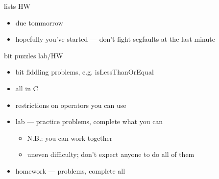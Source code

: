 \begin{frame}{lists HW}
    \begin{itemize}
        \item due tommorrow
        \item hopefully you've started --- don't fight segfaults at the last minute
    \end{itemize}
\end{frame}

\begin{frame}{bit puzzles lab/HW}
    \begin{itemize}
    \item bit fiddling problems, e.g. isLessThanOrEqual
    \item all in C
    \item restrictions on operators you can use
    \vspace{.5cm}
    \item lab --- practice problems, complete what you can
        \begin{itemize}
        \item N.B.: you can work together
        \item uneven difficulty; don't expect anyone to do all of them
        \end{itemize}
    \item homework ---  problems, complete all
    \end{itemize}
\end{frame}
